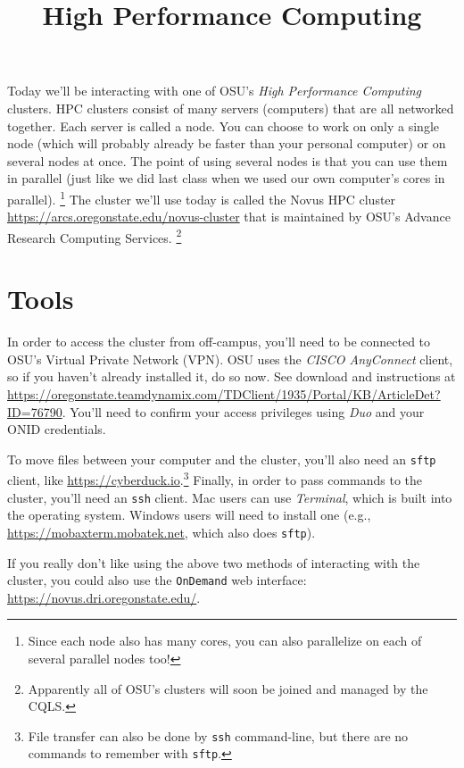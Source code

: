 \documentclass[12pt,letterpaper]{article}
\title{High Performance Computing}
\author{}
\date{}
\begin{document}
\maketitle
\tableofcontents

\clearpage

Today we'll be interacting with one of OSU's \emph{High Performance Computing} clusters.
HPC clusters consist of many servers (computers) that are all networked together.
Each server is called a node.
You can choose to work on only a single node
(which will probably already be faster than your personal computer)
or on several nodes at once.
The point of using several nodes is that you can use them in parallel
(just like we did last class when we used our own computer's cores in parallel).
\unskip
\footnote{Since each node also has many cores, you can also parallelize on each of several parallel nodes too!}
The cluster we'll use today is called the Novus HPC cluster \url{https://arcs.oregonstate.edu/novus-cluster} that is maintained by OSU's Advance Research Computing Services.
\unskip
\footnote{Apparently all of OSU's clusters will soon be joined and managed by the CQLS.}

\section{Tools}
In order to access the cluster from off-campus, you'll need to be connected to OSU's Virtual Private
Network (VPN).
OSU uses the \emph{CISCO AnyConnect} client, so if you haven't already installed it, do so now.
See download and instructions at
\url{https://oregonstate.teamdynamix.com/TDClient/1935/Portal/KB/ArticleDet?ID=76790}.
You'll need to confirm your access privileges using \emph{Duo} and your ONID credentials.

To move files between your computer and the cluster,
you'll also need an \texttt{sftp} client, like \url{https://cyberduck.io}.\footnote{File transfer can also be done by
\texttt{ssh} command-line, but there are no commands to remember with \texttt{sftp}.}
Finally, in order to pass commands to the cluster, you'll need an \texttt{ssh} client.
Mac users can use \emph{Terminal}, which is built into the operating system.
Windows users will need to install one (e.g., \url{https://mobaxterm.mobatek.net}, which also does
\texttt{sftp}).

If you really don't like using the above two methods of interacting with the cluster, you could also use the \texttt{OnDemand} web interface: \url{https://novus.dri.oregonstate.edu/}.
\end{document}
